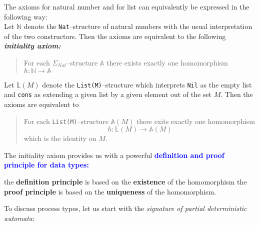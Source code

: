 \documentclass[landscape, autoslides, light]{mmiss}
\begin{document}
\begin{Package}[Label={FSDPT}, Title={Formal Specification of Data and Process Types}, ShortTitle={FSDPT}, Authors={Horst Reichel}, Date={February 2003}, LevelOfDetail=Lecture, Language=en-GB]
\begin{Section}[Title={Introduction}, Label={section2}]
\begin{Paragraph}[Title={Basic Intuition - Initiality}, Label=Paragraph13]
The  axioms for natural number and for list can equivalently be
expressed in the following way:\pause \\ Let $\mathbb{N}$ denote
the \texttt{Nat}--structure of natural numbers with the usual
interpretation of the two constructors. Then the  axioms are
equivalent to the following \emph{\textbf{initiality axiom:}}
\begin{quote} For each $\Sigma_{Nat}$--structure $\mathbb{A}$
there exists exactly one homomorphism \\$ h : \mathbb{ N} \to
\mathbb{A}$ \end{quote}


\end{Paragraph}
\begin{Paragraph}[Title={Basic Intuition - Initiality}, Label=Paragraph14]

Let $ \mathbb{L}(M)$ denote the \texttt{List(M)}--structure which
interprets \texttt{Nil} as the empty list and \texttt{cons} as
extending a given list by a given element out of the set $M$. Then
the axioms are equivalent to \begin{quote} For each
\texttt{List(M)}--structure $ \mathbb{A}(M)$ there exits exactly
one homomorphism $$ h : \mathbb{L}(M) \to \mathbb{A}(M)$$ which is
the identity on $M$.\end{quote}


\end{Paragraph}
\begin{Paragraph}[Title={Basic Intuition - Initiality}, Label=Paragraph15]

The initiality axiom provides us with a powerful
\textcolor{blue}{\textbf{definition and proof principle for data
types:}}
 \pause
\begin{List}[ListType=itemize]
 \ListItem the \textbf{definition principle} is based on the
\textbf{existence} of the homomorphism  \pause \ListItem the
\textbf{proof principle} is based on the \textbf{uniqueness} of
the homomorphism.
\end{List}


\end{Paragraph}
\begin{Paragraph}[Title={Basic Intuition - Finality}, Label=Paragraph16]

To discuss process types, let us start with the \emph{signature of
partial deterministic automata}:


\end{Paragraph}
\end{Section}
\end{Package}
\end{document}
